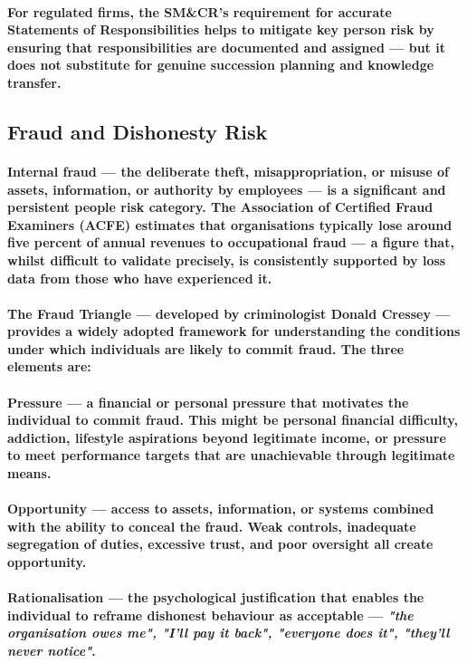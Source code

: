 \paragraph{For regulated firms, the SM\&CR's requirement for accurate Statements of Responsibilities helps to mitigate key person risk by ensuring that responsibilities are documented and assigned — but it does not substitute for genuine succession planning and knowledge transfer.}

\subsection{Fraud and Dishonesty Risk}
\paragraph{\textbf{Internal fraud} — the deliberate theft, misappropriation, or misuse of assets, information, or authority by employees — is a significant and persistent people risk category. The \textbf{Association of Certified Fraud Examiners (ACFE)} estimates that organisations typically lose around five percent of annual revenues to occupational fraud — a figure that, whilst difficult to validate precisely, is consistently supported by loss data from those who have experienced it.}
\paragraph{The \textbf{Fraud Triangle} — developed by criminologist Donald Cressey — provides a widely adopted framework for understanding the conditions under which individuals are likely to commit fraud. The three elements are:}
\paragraph{\textbf{Pressure} — a financial or personal pressure that motivates the individual to commit fraud. This might be personal financial difficulty, addiction, lifestyle aspirations beyond legitimate income, or pressure to meet performance targets that are unachievable through legitimate means.}
\paragraph{\textbf{Opportunity} — access to assets, information, or systems combined with the ability to conceal the fraud. Weak controls, inadequate segregation of duties, excessive trust, and poor oversight all create opportunity.}
\paragraph{\textbf{Rationalisation} — the psychological justification that enables the individual to reframe dishonest behaviour as acceptable — \textit{"the organisation owes me", "I'll pay it back", "everyone does it", "they'll never notice"}.}
